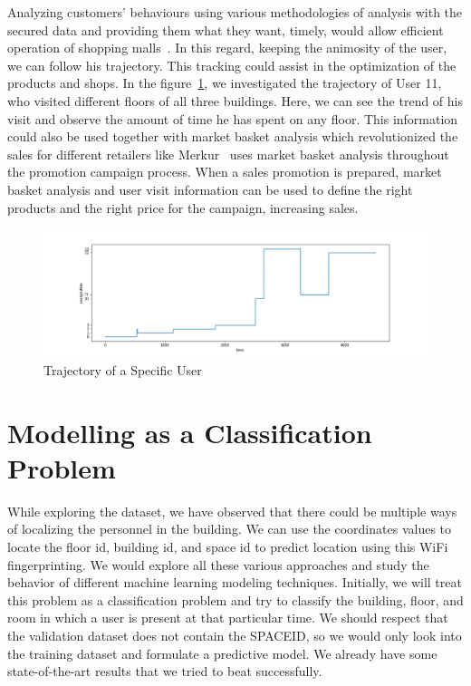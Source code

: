 \documentclass[a4paper,singleside,12pt]{report} %
\begin{document}
			Analyzing customers' behaviours using various methodologies of analysis with the secured data and providing them what they want, timely, would allow efficient operation of shopping malls~\cite{kim2015analysis}. 
			In this regard, keeping the animosity of the user, we can follow his trajectory. This tracking could assist in the optimization of the products and shops.
			In the figure~\ref{fig4.8}, we investigated the trajectory of User 11, who visited different floors of all three buildings. Here, we can see the trend of his visit and observe the amount of time he has spent on any floor. 
			This information could also be used together with market basket analysis which revolutionized the sales for different retailers like Merkur~\cite{svetina2005increase} uses market basket analysis throughout the promotion campaign process. 
			When a sales promotion is prepared, market basket analysis and user visit information can be used to define the right products and the right price for the campaign, increasing sales. 
	
			\begin{figure}[!htb]
			\centerline{\includegraphics[width=1.2\textwidth]{./figures/user11_by_building_plot_training.png}}
			\caption{Trajectory of a Specific User}
			\label{fig4.8}
			\end{figure}
	
\newpage


		\section{Modelling as a Classification Problem}

		While exploring the dataset, we have observed that there could be multiple ways of localizing the personnel in the building. 
		We can use the coordinates values to locate the floor id, building id, and space id to predict location using this WiFi fingerprinting. 
		We would explore all these various approaches and study the behavior of different machine learning modeling techniques. 
		Initially, we will treat this problem as a classification problem and try to classify the building, floor, and room in which a user is present at that particular time. 
		We should respect that the validation dataset does not contain the SPACEID, so we would only look into the training dataset and formulate a predictive model. 
		We already have some state-of-the-art results that we tried to beat successfully. 
		
\end{document}
